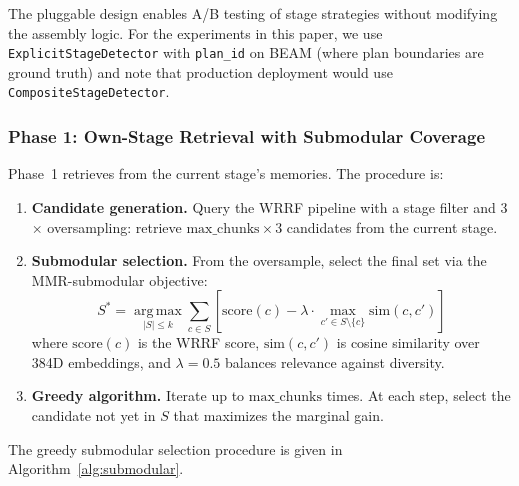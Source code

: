 \documentclass[11pt]{article}
\begin{document}
The pluggable design enables A/B testing of stage strategies without
modifying the assembly logic.  For the experiments in this paper, we
use \texttt{ExplicitStageDetector} with \texttt{plan\_id} on BEAM
(where plan boundaries are ground truth) and note that production
deployment would use \texttt{CompositeStageDetector}.

\subsubsection{Phase 1: Own-Stage Retrieval with Submodular Coverage}
\label{sec:phase1}

Phase~1 retrieves from the current stage's memories.  The procedure is:

\begin{enumerate}
  \item \textbf{Candidate generation.}  Query the WRRF pipeline with
    a stage filter and 3$\times$ oversampling: retrieve
    $\text{max\_chunks} \times 3$ candidates from the current stage.

  \item \textbf{Submodular selection.}  From the oversample, select
    the final set via the MMR-submodular objective:
    \begin{equation}
    S^* = \operatorname*{arg\,max}_{|S| \leq k} \sum_{c \in S} \left[\text{score}(c) - \lambda \cdot \max_{c' \in S \setminus \{c\}} \text{sim}(c, c')\right]
    \label{eq:mmr}
    \end{equation}
    where $\text{score}(c)$ is the WRRF score,
    $\text{sim}(c, c')$ is cosine similarity over 384D embeddings,
    and $\lambda = 0.5$ balances relevance against diversity.

  \item \textbf{Greedy algorithm.}  Iterate up to
    $\text{max\_chunks}$ times.  At each step, select the candidate
    not yet in $S$ that maximizes the marginal gain.
\end{enumerate}

The greedy submodular selection procedure is given in
Algorithm~\ref{alg:submodular}.
\end{document}
